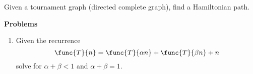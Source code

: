 \begin{example}
    Given a tournament graph (directed complete graph), find a Hamiltonian path.
\end{example}

{\Large\textbf{Problems}}
\begin{enumerate}
    \item Given the recurrence
          \begin{equation*}
              \func{T}{n} = \func{T}{\alpha n} + \func{T}{\beta n} + n
          \end{equation*}
          solve for \(\alpha + \beta < 1\) and \(\alpha + \beta = 1\).
\end{enumerate}
\newpage